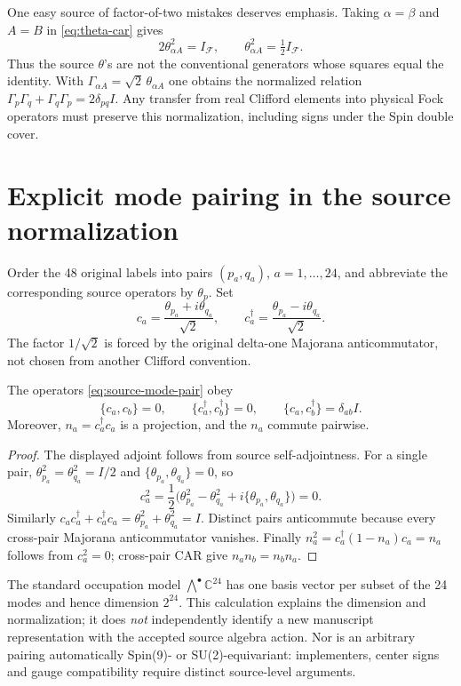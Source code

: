 One easy source of factor-of-two mistakes deserves emphasis. Taking
$\alpha=\beta$ and $A=B$ in \eqref{eq:theta-car} gives
\begin{equation}\label{eq:theta-square}
 2\theta_{\alpha A}^2=I_{\mathcal F},\qquad
 \theta_{\alpha A}^2=\tfrac12 I_{\mathcal F}.
\end{equation}
Thus the source $\theta$'s are not the conventional generators whose
squares equal the identity. With $\Gamma_{\alpha A}=\sqrt2\,\theta_{\alpha A}$
one obtains the normalized relation
$\Gamma_p\Gamma_q+\Gamma_q\Gamma_p=2\delta_{pq}I$.
Any transfer from real Clifford elements into physical Fock operators must
preserve this normalization, including signs under the Spin double cover.

\section{Explicit mode pairing in the source normalization}
Order the 48 original labels into pairs $(p_a,q_a)$,
$a=1,\ldots,24$, and abbreviate the corresponding source
operators by $\theta_p$. Set
\begin{equation}\label{eq:source-mode-pair}
 c_a=\frac{\theta_{p_a}+i\theta_{q_a}}{\sqrt{2}},
 \qquad c_a^\dagger=\frac{\theta_{p_a}-i\theta_{q_a}}{\sqrt{2}}.
\end{equation}
The factor $1/\sqrt2$ is forced by the original delta-one
Majorana anticommutator, not chosen from another Clifford convention.

\begin{proposition}
The operators \eqref{eq:source-mode-pair} obey
\begin{equation}\label{eq:source-complex-car}
 \{c_a,c_b\}=0,\qquad
 \{c_a^\dagger,c_b^\dagger\}=0,\qquad
 \{c_a,c_b^\dagger\}=\delta_{ab}I.
\end{equation}
Moreover, $n_a=c_a^\dagger c_a$ is a projection, and the
$n_a$ commute pairwise.
\end{proposition}
\begin{proof}
The displayed adjoint follows from source self-adjointness.
For a single pair, $\theta_{p_a}^2=\theta_{q_a}^2=I/2$
and $\{\theta_{p_a},\theta_{q_a}\}=0$, so
\[
 c_a^2=\frac12\bigl(\theta_{p_a}^2-\theta_{q_a}^2+
 i\{\theta_{p_a},\theta_{q_a}\}\bigr)=0.
\]
Similarly $c_ac_a^\dagger+c_a^\dagger c_a
=\theta_{p_a}^2+\theta_{q_a}^2=I$.
Distinct pairs anticommute because every cross-pair Majorana
anticommutator vanishes. Finally
$n_a^2=c_a^\dagger(1-n_a)c_a=n_a$ follows from $c_a^2=0$;
cross-pair CAR give $n_an_b=n_bn_a$.
\end{proof}
The standard occupation model $\bigwedge^\bullet\mathbb C^{24}$
has one basis vector per subset of the 24 modes and hence dimension
$2^{24}$. This calculation explains the dimension and normalization;
it does \emph{not} independently identify a new manuscript
representation with the accepted source algebra action. Nor is an
arbitrary pairing automatically Spin(9)- or SU(2)-equivariant:
implementers, center signs and gauge compatibility require distinct
source-level arguments.

